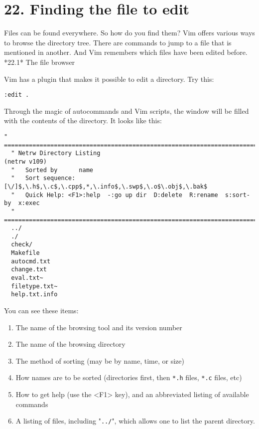 \section{22. Finding the file to edit}
Files can be found everywhere.  So how do you find them?  Vim offers various
ways to browse the directory tree.  There are commands to jump to a file that
is mentioned in another.  And Vim remembers which files have been edited
before.
*22.1*    The file browser

Vim has a plugin that makes it possible to edit a directory.  Try this:

\begin{Verbatim}[samepage=true]
 :edit .
\end{Verbatim}

Through the magic of autocommands and Vim scripts, the window will be filled with the contents of the directory.
It looks like this:

\begin{Verbatim}[samepage=true]
  " ============================================================================ 
  " Netrw Directory Listing                                        (netrw v109) 
  "   Sorted by      name 
  "   Sort sequence: [\/]$,\.h$,\.c$,\.cpp$,*,\.info$,\.swp$,\.o$\.obj$,\.bak$ 
  "   Quick Help: <F1>:help  -:go up dir  D:delete  R:rename  s:sort-by  x:exec 
  " ============================================================================ 
  ../ 
  ./ 
  check/ 
  Makefile 
  autocmd.txt 
  change.txt 
  eval.txt~ 
  filetype.txt~ 
  help.txt.info 
\end{Verbatim}

You can see these items:

\begin{enumerate}
\item The name of the browsing tool and its version number
\item The name of the browsing directory
\item The method of sorting (may be by name, time, or size)
\item How names are to be sorted (directories first, then \verb!*.h! files, \verb!*.c! files, etc)
\item How to get help (use the <F1> key), and an abbreviated listing of available commands
\item A listing of files, including "\verb!../!", which allows one to list the parent directory.
\end{enumerate}

